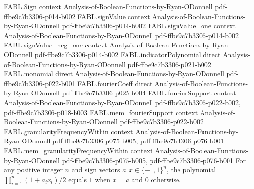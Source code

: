 \begin{theorem}
\label{FABL.indicatorPolynomial_eq_ite}
\leanok
{}
\proofstep
  {FABL.Sign}
  {context}
  {Analysis-of-Boolean-Functions-by-Ryan-ODonnell}
  {pdf-ffbe9c7b3306-p014-b002}
\proofstep
  {FABL.signValue}
  {context}
  {Analysis-of-Boolean-Functions-by-Ryan-ODonnell}
  {pdf-ffbe9c7b3306-p014-b002}
\proofstep
  {FABL.signValue_one}
  {context}
  {Analysis-of-Boolean-Functions-by-Ryan-ODonnell}
  {pdf-ffbe9c7b3306-p014-b002}
\proofstep
  {FABL.signValue_neg_one}
  {context}
  {Analysis-of-Boolean-Functions-by-Ryan-ODonnell}
  {pdf-ffbe9c7b3306-p014-b002}
\proofstep
  {FABL.indicatorPolynomial}
  {direct}
  {Analysis-of-Boolean-Functions-by-Ryan-ODonnell}
  {pdf-ffbe9c7b3306-p021-b002}
\proofstep
  {FABL.monomial}
  {direct}
  {Analysis-of-Boolean-Functions-by-Ryan-ODonnell}
  {pdf-ffbe9c7b3306-p022-b001}
\proofstep
  {FABL.fourierCoeff}
  {direct}
  {Analysis-of-Boolean-Functions-by-Ryan-ODonnell}
  {pdf-ffbe9c7b3306-p025-b004}
\proofstep
  {FABL.fourierSupport}
  {context}
  {Analysis-of-Boolean-Functions-by-Ryan-ODonnell}
  {pdf-ffbe9c7b3306-p022-b002,
    pdf-ffbe9c7b3306-p018-b003}
\proofstep
  {FABL.mem_fourierSupport}
  {context}
  {Analysis-of-Boolean-Functions-by-Ryan-ODonnell}
  {pdf-ffbe9c7b3306-p022-b002}
\proofstep
  {FABL.granularityFrequencyWithin}
  {context}
  {Analysis-of-Boolean-Functions-by-Ryan-ODonnell}
  {pdf-ffbe9c7b3306-p075-b005,
    pdf-ffbe9c7b3306-p076-b001}
\proofstep
  {FABL.mem_granularityFrequencyWithin}
  {context}
  {Analysis-of-Boolean-Functions-by-Ryan-ODonnell}
  {pdf-ffbe9c7b3306-p075-b005,
    pdf-ffbe9c7b3306-p076-b001}
For any positive integer $n$ and sign vectors $a,x\in\{ -1,1\}^n$, the polynomial
$\prod_{i=1}^n(1+a_i x_i)/2$ equals $1$ when $x=a$ and $0$ otherwise.
\end{theorem}

